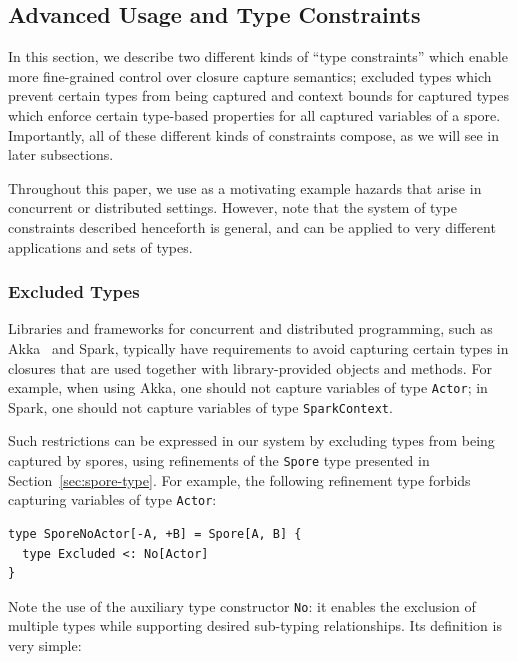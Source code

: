 \documentclass{llncs}
\begin{document}
\subsection{Advanced Usage and Type Constraints}
\label{sec:adv-usage-type-constraints}
\vspace{1mm}

In this section, we describe two different kinds of ``type constraints'' which
enable more fine-grained control over closure capture semantics; excluded
types which prevent certain types from being captured and context bounds for
captured types which enforce certain type-based properties for all captured
variables of a spore. Importantly, all of these different kinds of constraints
compose, as we will see in later subsections.


Throughout this paper, we use as a motivating example hazards that arise in
concurrent or distributed settings. However, note that the system of type
constraints described henceforth is general, and can be applied to very
different applications and sets of types.

\subsubsection{Excluded Types}
\label{sec:excluded-types}

Libraries and frameworks for concurrent and distributed programming, such as Akka~\cite{Akka} and Spark, typically have requirements to avoid capturing certain types in closures that are used together with library-provided objects and methods. For example, when using Akka, one should not capture variables of type \verb|Actor|; in Spark, one should not capture variables of type \verb|SparkContext|.

Such restrictions can be expressed in our system by excluding types from being
captured by spores, using refinements of the \verb|Spore| type presented in
Section~\ref{sec:spore-type}. For example, the following refinement type
forbids capturing variables of type \verb|Actor|:

\begin{lstlisting}
type SporeNoActor[-A, +B] = Spore[A, B] {
  type Excluded <: No[Actor]
}
\end{lstlisting}
\noindent
Note the use of the auxiliary type constructor \verb|No|: it enables the exclusion of multiple types while supporting desired sub-typing relationships. Its definition is very simple:
\end{document}
